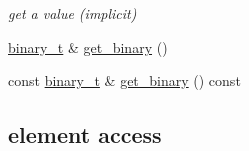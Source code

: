 \begin{DoxyCompactItemize}
\begin{DoxyCompactList}\small\item\em get a value (implicit) \end{DoxyCompactList}\item 
\hyperlink{classnlohmann_1_1basic__json_ad6c955145bebde84d93991ffed7cd389}{binary\+\_\+t} \& \hyperlink{classnlohmann_1_1basic__json_aab19a246f6bcd27c195bed376cf5e138}{get\+\_\+binary} ()
\item 
const \hyperlink{classnlohmann_1_1basic__json_ad6c955145bebde84d93991ffed7cd389}{binary\+\_\+t} \& \hyperlink{classnlohmann_1_1basic__json_a9a1e5ecdeb44ae79d3bda00c4c775f71}{get\+\_\+binary} () const 
\end{DoxyCompactItemize}
\subsection*{element access}
\label{_amgrpf68418821a90b03a001117a613b131dd}%
